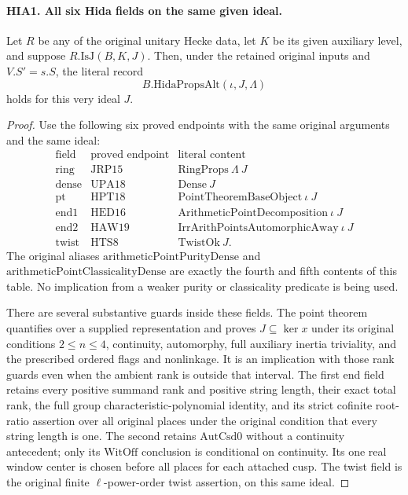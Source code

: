 \paragraph{HIA1. All six Hida fields on the same given ideal.}
\label{claim:HIA1}
Let \(R\) be any of the original unitary Hecke data, let \(K\)
be its given auxiliary level, and suppose
\(R.\mathrm{IsJ}(B,K,J)\).  Then, under the retained original
inputs and \(V.S'=s.S\), the literal record
\[
                         B.\mathrm{HidaPropsAlt}(\iota,J,\Lambda)
                         \tag{HIA.1}
\]
holds for this very ideal \(J\).
\begin{proof}
Use the following six proved endpoints with the same original
arguments and the same ideal:
\[
\begin{array}{c|c|l}
\text{field}&\text{proved endpoint}&\text{literal content}\\ \hline
\mathrm{ring}&\mathrm{JRP15}&\mathrm{RingProps}\ \Lambda\ J\\
\mathrm{dense}&\mathrm{UPA18}&\mathrm{Dense}\ J\\
\mathrm{pt}&\mathrm{HPT18}&\mathrm{PointTheoremBaseObject}\ \iota\ J\\
\mathrm{end1}&\mathrm{HED16}&\mathrm{ArithmeticPointDecomposition}\ \iota\ J\\
\mathrm{end2}&\mathrm{HAW19}&\mathrm{IrrArithPointsAutomorphicAway}\ \iota\ J\\
\mathrm{twist}&\mathrm{HTS8}&\mathrm{TwistOk}\ J.
\end{array}
\tag{HIA.2}
\]
The original aliases \(\mathrm{arithmeticPointPurityDense}\)
and \(\mathrm{arithmeticPointClassicalityDense}\) are exactly
the fourth and fifth contents of this table.  No implication
from a weaker purity or classicality predicate is being used.

There are several substantive guards inside these fields.
The point theorem quantifies over a supplied representation
and proves \(J\subseteq\ker x\) under its original conditions
\(2\leq n\leq4\), continuity, automorphy, full auxiliary
inertia triviality, and the prescribed ordered flags and
nonlinkage.  It is an implication with those rank guards even
when the ambient rank is outside that interval.  The first
end field retains every positive summand rank and positive
string length, their exact total rank, the full group
characteristic-polynomial identity, and its strict cofinite
root-ratio assertion over all original places under the original
condition that every string length is one.  The second
retains \(\mathrm{AutCsd0}\) without a continuity antecedent;
only its \(\mathrm{WitOff}\) conclusion is conditional on
continuity.  Its one real window center is chosen before all
places for each attached cusp.  The twist field is the
original finite \(\ell\)-power-order twist assertion, on this same ideal.


\end{proof}
